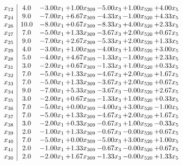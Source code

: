 \documentclass[8pt]{article}
\begin{document}
\[\begin{array}{c| c c@{\hskip 2pt} c@{\hskip 2pt} c@{\hskip 2pt} c@{\hskip 2pt} c@{\hskip 2pt} }
 x_{12}   &  4.0 & -3.00 x_{1} & +  1.00 x_{309} & -5.00 x_{3} & +  1.00 x_{520} & +  4.00 x_{5}\\
 x_{24}   &  9.0 & -7.00 x_{1} & +  6.67 x_{309} & -4.33 x_{3} & -1.00 x_{520} & +  4.33 x_{5}\\
 x_{26}   &  10.0 & -8.00 x_{1} & +  0.67 x_{309} & -8.33 x_{3} & +  4.00 x_{520} & +  2.33 x_{5}\\
 x_{27}   &  7.0 & -5.00 x_{1} & +  1.33 x_{309} & -3.67 x_{3} & +  2.00 x_{520} & +  0.67 x_{5}\\
 x_{25}   &  9.0 & -7.00 x_{1} & +  2.67 x_{309} & -5.33 x_{3} & +  2.00 x_{520} & +  1.33 x_{5}\\
 x_{29}   &  4.0 & -3.00 x_{1} & +  1.00 x_{309} & -4.00 x_{3} & +  1.00 x_{520} & +  3.00 x_{5}\\
 x_{28}   &  5.0 & -4.00 x_{1} & +  4.67 x_{309} & -1.33 x_{3} & -1.00 x_{520} & +  2.33 x_{5}\\
 x_{31}   &  3.0 & -2.00 x_{1} & +  0.67 x_{309} & -1.33 x_{3} & +  1.00 x_{520} & +  0.33 x_{5}\\
 x_{32}   &  7.0 & -5.00 x_{1} & +  1.33 x_{309} & -4.67 x_{3} & +  2.00 x_{520} & +  1.67 x_{5}\\
 x_{33}   &  7.0 & -5.00 x_{1} & +  1.33 x_{309} & -3.67 x_{3} & +  2.00 x_{520} & +  0.67 x_{5}\\
 x_{34}   &  9.0 & -7.00 x_{1} & +  5.33 x_{309} & -3.67 x_{3} & -0.00 x_{520} & +  2.67 x_{5}\\
 x_{35}   &  3.0 & -2.00 x_{1} & +  0.67 x_{309} & -1.33 x_{3} & +  1.00 x_{520} & +  0.33 x_{5}\\
 x_{36}   &  7.0 & -5.00 x_{1} & +  0.00 x_{309} & -4.00 x_{3} & +  3.00 x_{520} & -1.00 x_{5}\\
 x_{37}   &  7.0 & -5.00 x_{1} & +  1.33 x_{309} & -4.67 x_{3} & +  2.00 x_{520} & +  1.67 x_{5}\\
 x_{38}   &  3.0 & -2.00 x_{1} & +  0.33 x_{309} & -0.67 x_{3} & +  1.00 x_{520} & -0.33 x_{5}\\
 x_{39}   &  2.0 & -1.00 x_{1} & +  1.33 x_{309} & -0.67 x_{3} & -0.00 x_{520} & +  0.67 x_{5}\\
 x_{40}   &  7.0 & -5.00 x_{1} & +  0.00 x_{309} & -5.00 x_{3} & +  3.00 x_{520} & +  1.00 x_{5}\\
 x_{41}   &  2.0 & -1.00 x_{1} & +  1.33 x_{309} & -0.67 x_{3} & -0.00 x_{520} & +  0.67 x_{5}\\
 x_{30}   &  2.0 & -2.00 x_{1} & +  1.67 x_{309} & -1.33 x_{3} & -0.00 x_{520} & +  1.33 x_{5}\\

\end{array}\]
\end{document}
